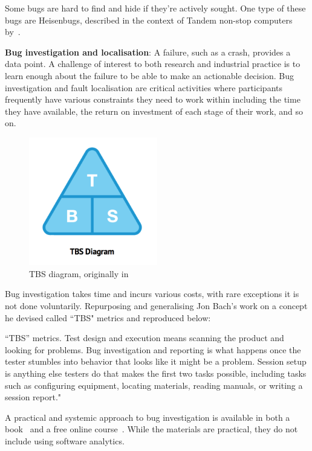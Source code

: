 Some bugs are hard to find and hide if they're actively sought. One type of these bugs are Heisenbugs, described in the context of Tandem non-stop computers by~\citep{gray1986_why_do_computers_stop_and_what_can_be_done_about_it}.

\textbf{Bug investigation and localisation}: A failure, such as a crash, provides a data point. A challenge of interest to both research and industrial practice is to learn enough about the failure to be able to make an actionable decision. Bug investigation and fault localisation 
are critical activities where participants frequently have various constraints they need to work within including the time they have available, the return on investment of each stage of their work, and so on.

\begin{figure}
    \centering
    \includegraphics[width = 0.5\textwidth]{images/mobile-analytics-playbook/TBS.png}
    \caption{TBS diagram, originally in~\citep{harty_aymer_playbook_2016}}
    \label{fig:my_tbs_diagram}
\end{figure}

Bug investigation takes time and incurs various costs, with rare exceptions it is not done voluntarily. Repurposing and generalising Jon Bach's work on a concept he devised called ``TBS" metrics and reproduced below:

“TBS” metrics. Test design and execution means scanning the product and looking for problems. Bug investigation and reporting is what happens once the tester stumbles into behavior that looks like it might be a problem. Session setup is anything else testers do that makes the first two tasks possible, including tasks such as configuring equipment, locating materials, reading manuals, or writing a session report."~\citep{bach2000_sbtm}

A practical and systemic approach to bug investigation is available in both a book~\citep{zeller2009_why_programs_fail} and a free online course~\citep{zeller2012_udacity_software_debugging_course}. While the materials are practical, they do not include using software analytics.

